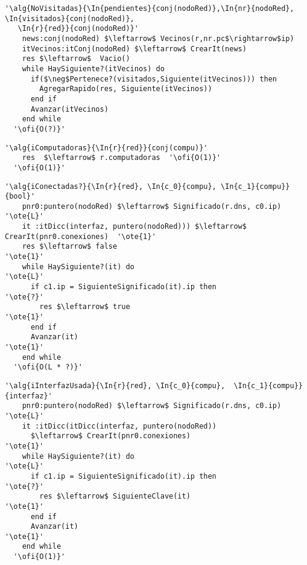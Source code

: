 \begin{lstlisting}[mathescape]
  '\alg{NoVisitadas}{\In{pendientes}{conj(nodoRed)},\In{nr}{nodoRed}, \In{visitados}{conj(nodoRed)},
   \In{r}{red}}{conj(nodoRed)}'
    news:conj(nodoRed) $\leftarrow$ Vecinos(r,nr.pc$\rightarrow$ip)
    itVecinos:itConj(nodoRed) $\leftarrow$ CrearIt(news)
    res $\leftarrow$  Vacio()
    while HaySiguiente?(itVecinos) do                                                    
      if($\neg$Pertenece?(visitados,Siguiente(itVecinos))) then
        AgregarRapido(res, Siguiente(itVecinos))
      end if
      Avanzar(itVecinos)
    end while
  '\ofi{O(?)}'
\end{lstlisting}

\begin{lstlisting}[mathescape]
  '\alg{iComputadoras}{\In{r}{red}}{conj(compu)}'
    res  $\leftarrow$ r.computadoras  '\ofi{O(1)}'
  '\ofi{O(1)}'
\end{lstlisting}

\begin{lstlisting}[mathescape]
  '\alg{iConectadas?}{\In{r}{red}, \In{c_0}{compu}, \In{c_1}{compu}}{bool}'
    pnr0:puntero(nodoRed) $\leftarrow$ Significado(r.dns, c0.ip)                   '\ote{L}' 
    it :itDicc(interfaz, puntero(nodoRed))) $\leftarrow$ CrearIt(pnr0.conexiones)  '\ote{1}' 
    res $\leftarrow$ false                                                         '\ote{1}'
    while HaySiguiente?(it) do                                                     '\ote{L}'
      if c1.ip = SiguienteSignificado(it).ip then                                  '\ote{?}'
        res $\leftarrow$ true                                                      '\ote{1}'
      end if
      Avanzar(it)                                                                  '\ote{1}'
    end while
  '\ofi{O(L * ?)}'
\end{lstlisting}

\begin{lstlisting}[mathescape]
  '\alg{iInterfazUsada}{\In{r}{red}, \In{c_0}{compu},  \In{c_1}{compu}}{interfaz}'
    pnr0:puntero(nodoRed) $\leftarrow$ Significado(r.dns, c0.ip)                   '\ote{L}' 
    it :itDicc(itDicc(interfaz, puntero(nodoRed)) 
      $\leftarrow$ CrearIt(pnr0.conexiones)                                        '\ote{1}' 
    while HaySiguiente?(it) do                                                     '\ote{L}'
      if c1.ip = SiguienteSignificado(it).ip then                                  '\ote{?}'
        res $\leftarrow$ SiguienteClave(it)                                        '\ote{1}'
      end if
      Avanzar(it)                                                                  '\ote{1}'
    end while
  '\ofi{O(1)}'
\end{lstlisting}


